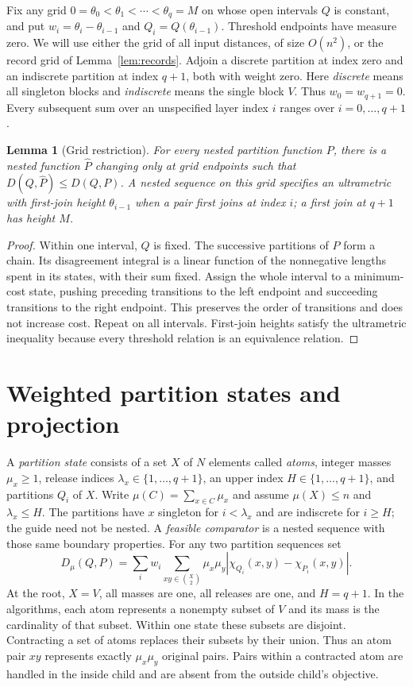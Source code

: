 \documentclass[11pt]{article}
\newtheorem{lemma}[theorem]{Lemma}
\theoremstyle{definition}
\newcommand{\join}{\chi}
\begin{document}
Fix any grid $0=\theta_0<\theta_1<\cdots<\theta_q=M$ on whose open
intervals $Q$ is constant, and put $w_i=\theta_i-\theta_{i-1}$ and
$Q_i=Q(\theta_{i-1})$. Threshold endpoints have measure zero.
We will use either the grid of all input distances, of size $O(n^2)$,
or the record grid of Lemma~\ref{lem:records}.
Adjoin a discrete partition at index zero and an indiscrete partition
at index $q+1$, both with weight zero. Here \emph{discrete} means all
singleton blocks and \emph{indiscrete} means the single block $V$.
Thus $w_0=w_{q+1}=0$. Every subsequent sum over an unspecified layer
index $i$ ranges over $i=0,\ldots,q+1$.

\begin{lemma}[Grid restriction]\label{lem:grid}
For every nested partition function $P$, there is a nested function
$\widehat P$ changing only at grid endpoints such that
$D(Q,\widehat P)\le D(Q,P)$. A nested sequence on this grid specifies
an ultrametric with first-join height $\theta_{i-1}$ when a pair first
joins at index $i$; a first join at $q+1$ has height $M$.
\end{lemma}
\begin{proof}
Within one interval, $Q$ is fixed. The successive partitions of $P$ form
a chain. Its disagreement integral is a linear function of the nonnegative
lengths spent in its states, with their sum fixed. Assign the whole interval
to a minimum-cost state, pushing preceding transitions to the left endpoint
and succeeding transitions to the right endpoint. This preserves the order
of transitions and does not increase cost. Repeat on all intervals.
First-join heights satisfy the ultrametric inequality because every
threshold relation is an equivalence relation.
\end{proof}

\section{Weighted partition states and projection}
\label{sec:projection}

A \emph{partition state} consists of a set $X$ of $N$ elements called
\emph{atoms}, integer masses $\mu_x\ge1$, release indices
$\lambda_x\in\{1,\ldots,q+1\}$, an upper index $H\in\{1,\ldots,q+1\}$,
and partitions $Q_i$ of $X$. Write $\mu(C)=\sum_{x\in C}\mu_x$ and
assume $\mu(X)\le n$ and $\lambda_x\le H$.
The partitions have $x$ singleton for $i<\lambda_x$ and are indiscrete
for $i\ge H$; the guide need not be nested.
A \emph{feasible comparator} is a nested sequence with those same
boundary properties. For any two partition sequences set
\[
 D_\mu(Q,P)=\sum_iw_i\sum_{xy\in\binom X2}
       \mu_x\mu_y|\join_{Q_i}(x,y)-\join_{P_i}(x,y)|.
\]
At the root, $X=V$, all masses are one, all releases are one, and $H=q+1$.
In the algorithms, each atom represents a nonempty subset of $V$ and
its mass is the cardinality of that subset. Within one state these
subsets are disjoint. Contracting a set of atoms replaces their subsets
by their union. Thus an atom pair $xy$ represents exactly $\mu_x\mu_y$
original pairs. Pairs within a contracted atom are handled in the
inside child and are absent from the outside child's objective.
\end{document}
